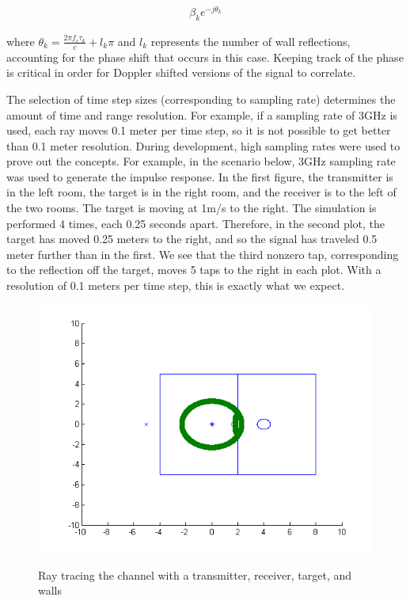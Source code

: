 \documentclass[article,11pt,onecolumn,final]{IEEEtran}
\begin{document}
\begin{align*}
\beta_{k} e^{-j \theta_k}
\end{align*}

where $\theta_k=\frac{2 \pi f_c \tau_k}{c} + l_k \pi$
and $l_k$ represents the number of wall reflections, accounting for the phase shift that occurs in this case. Keeping track of the phase is critical in order for Doppler shifted versions of the signal to correlate.

The selection of time step sizes (corresponding to sampling rate) determines the amount of time and range resolution. For example, if a sampling rate of 3GHz is used, each ray moves 0.1 meter per time step, so it is not possible to get better than 0.1 meter resolution. During development, high sampling rates were used to prove out the concepts. For example, in the scenario below, 3GHz sampling rate was used to generate the impulse response. In the first figure, the transmitter is in the left room, the target is in the right room, and the receiver is to the left of the two rooms. The target is moving at 1m/s to the right. The simulation is performed 4 times, each 0.25 seconds apart. Therefore, in the second plot, the target has moved 0.25 meters to the right, and so the signal has traveled 0.5 meter further than in the first. We see that the third nonzero tap, corresponding to the reflection off the target, moves 5 taps to the right in each plot. With a resolution of 0.1 meters per time step, this is exactly what we expect.

\pagebreak

\begin{figure}
\caption{Ray tracing the channel with a transmitter, receiver, target, and walls}
\centering
\includegraphics[width=400pt]{sim/simulation.png}  \\
\label{fig:Ray Tracing Channel}
\end{figure}
\end{document}
